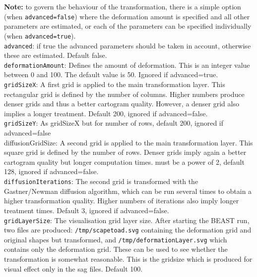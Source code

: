 \documentclass{article}
\begin{document}
{\bf Note:} to govern the behaviour of the transformation, there is a simple option (when {\tt advanced=false}) where the deformation amount is specified and all other parameters are estimated, or each of the parameters can be specified individually (when {\tt advanced=true}).\\

{\tt advanced}: if true the advanced parameters should be taken in account, otherwise these are estimated. Default false.\\

{\tt deformationAmount}: Defines the amount of deformation. This is an integer value between 0 and 100. The default value is 50. Ignored if advanced=true.\\

{\tt gridSizeX}: A first grid is applied to the main transformation layer. 
This rectangular grid is defined by the number of columns. 
Higher numbers produce denser grids and thus a better cartogram quality. 
However, a denser grid also implies a longer treatment. 
Default 200, ignored if advanced=false.\\

{\tt gridSizeY}: As gridSizeX but for number of rows, default 200, ignored if advanced=false\\
diffusionGridSize: A second grid is applied to the main transformation layer. 
This square grid is defined by the number of rows. 
Denser grids imply again a better cartogram quality but longer computation times.
must be a power of 2, default 128, ignored if advanced=false.\\

{\tt diffusionIterations}: The second grid is transformed with the Gastner/Newman diffusion 
algorithm, which can be run several times to obtain a higher transformation quality. 
Higher numbers of iterations also imply longer treatment times.
Default 3, ignored if advanced=false.\\

{\tt gridLayerSize}: The visualisation grid layer size. After starting the BEAST run, two files are produced:
{\tt /tmp/scapetoad.svg} containing the deformation grid and original shapes but transformed, and 
{\tt /tmp/deformationLayer.svg} which contains only the deformation grid. These can be used to see whether the transformation is somewhat reasonable. This is the gridsize which is produced for visual effect only in the sag files. 
Default 100.
\end{document}
